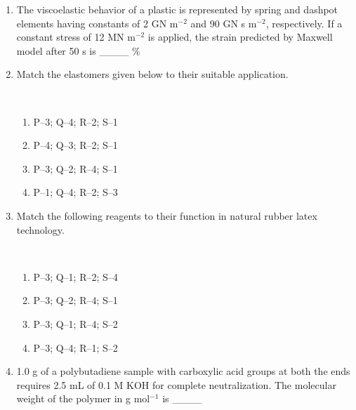 \documentclass[journal,12pt,onecolumn]{IEEEtran}
\begin{document}
\begin{enumerate}[label=\arabic*)]
\vspace{0.5cm}

\item The viscoelastic behavior of a plastic is represented by spring and dashpot elements having constants of 2 GN m$^{-2}$ and 90 GN s m$^{-2}$, respectively. If a constant stress of 12 MN m$^{-2}$ is applied, the strain predicted by Maxwell model after 50 s is \_\_\_\_ \%
\hfill{} \\

\vspace{0.5cm}
\newpage

\item Match the elastomers given below to their suitable application.



\hfill{} \\

\vspace{0.2cm}
\begin{enumerate}[label=\alph*)]
\item P–3; Q–4; R–2; S–1
\item P–4; Q–3; R–2; S–1
\item P–3; Q–2; R–4; S–1
\item P–1; Q–4; R–2; S–3
\end{enumerate}


\item Match the following reagents to their function in natural rubber latex technology.



\hfill{} \\

\vspace{0.2cm}
\begin{enumerate}[label=\alph*)]
\item P–3; Q–1; R–2; S–4
\item P–3; Q–2; R–4; S–1
\item P–3; Q–1; R–4; S–2
\item P–3; Q–4; R–1; S–2
\end{enumerate}

\vspace{0.5cm}

\item 1.0 g of a polybutadiene sample with carboxylic acid groups at both the ends requires 2.5 mL of 0.1 M KOH for complete neutralization. The molecular weight of the polymer in g mol$^{-1}$ is \_\_\_\_
\vspace{0.5cm}
\hfill{} \\



\end{enumerate}
\end{document}
